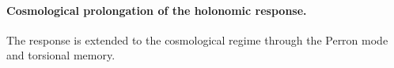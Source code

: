 \let\HMTOwnerSubsubsection\subsubsection
\let\HMTOwnerParagraph\paragraph
\let\chapter\HMTOwnerSection
\let\section\HMTOwnerSubsection
\let\subsection\HMTOwnerSubsubsection
\let\subsubsection\HMTOwnerParagraph

\endgroup
\paragraph{Cosmological prolongation of the holonomic response.}
The response is extended to the cosmological regime through the Perron mode and torsional memory.

